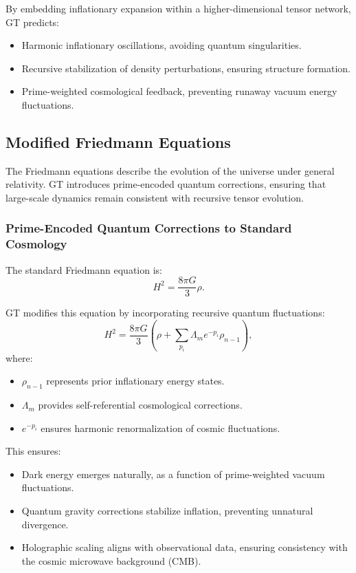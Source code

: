 \documentclass{article}
\theoremstyle{plain}
\begin{document}
By embedding inflationary expansion within a higher-dimensional tensor network, GT predicts:
\begin{itemize}
\item Harmonic inflationary oscillations, avoiding quantum singularities.
\item Recursive stabilization of density perturbations, ensuring structure formation.
\item Prime-weighted cosmological feedback, preventing runaway vacuum energy fluctuations.
\end{itemize}

\subsection{Modified Friedmann Equations}
The Friedmann equations describe the evolution of the universe under general relativity. GT introduces prime-encoded quantum corrections, ensuring that large-scale dynamics remain consistent with recursive tensor evolution.

\subsubsection{Prime-Encoded Quantum Corrections to Standard Cosmology}
The standard Friedmann equation is:
\begin{equation}
H^2 = \frac{8\pi G}{3} \rho.
\end{equation}

GT modifies this equation by incorporating recursive quantum fluctuations:
\begin{equation}
H^2 = \frac{8\pi G}{3} \left( \rho + \sum_{p_i} \Lambda_m e^{-p_i} \rho_{n-1} \right),
\end{equation}
where:
\begin{itemize}
\item $\rho_{n-1}$ represents prior inflationary energy states.
\item $\Lambda_m$ provides self-referential cosmological corrections.
\item $e^{-p_i}$ ensures harmonic renormalization of cosmic fluctuations.
\end{itemize}

This ensures:
\begin{itemize}
\item Dark energy emerges naturally, as a function of prime-weighted vacuum fluctuations.
\item Quantum gravity corrections stabilize inflation, preventing unnatural divergence.
\item Holographic scaling aligns with observational data, ensuring consistency with the cosmic microwave background (CMB).
\end{itemize}
\end{document}
